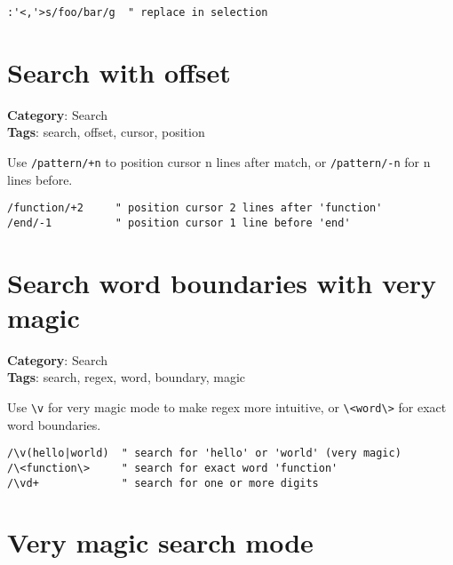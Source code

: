 {{{{{{{{{{{{{\begin{Exa*}{}
\begin{Verbatim}[fontsize=\footnotesize, breaklines, breakanywhere]
:'<,'>s/foo/bar/g  " replace in selection
\end{Verbatim}
\end{Exa*}

\section{Search with offset}

\textbf{Category}: Search\\ \textbf{Tags}: search, offset, cursor, position
\vspace{0.5cm}

Use {\footnotesize \Verb§/pattern/+n§} to position cursor n lines after match, or {\footnotesize \Verb§/pattern/-n§} for n lines before.

\begin{Exa*}{}
\begin{Verbatim}[fontsize=\footnotesize, breaklines, breakanywhere]
/function/+2     " position cursor 2 lines after 'function'
/end/-1          " position cursor 1 line before 'end'
\end{Verbatim}
\end{Exa*}

\section{Search word boundaries with very magic}

\textbf{Category}: Search\\ \textbf{Tags}: search, regex, word, boundary, magic
\vspace{0.5cm}

Use {\footnotesize \Verb§\v§} for very magic mode to make regex more intuitive, or {\footnotesize \Verb§\<word\>§} for exact word boundaries.

\begin{Exa*}{}
\begin{Verbatim}[fontsize=\footnotesize, breaklines, breakanywhere]
/\v(hello|world)  " search for 'hello' or 'world' (very magic)
/\<function\>     " search for exact word 'function'
/\vd+             " search for one or more digits
\end{Verbatim}
\end{Exa*}

\section{Very magic search mode}

}}}}}}}}}}}}}
